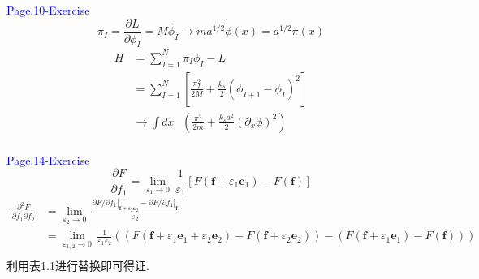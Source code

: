 \documentclass[12pt, a4paper, oneside]{ctexart}
\begin{document}
\textcolor{blue}{Page.10-Exercise}
\[{{\pi }_{I}}=\frac{\partial L}{\partial {{\phi }_{I}}}=M{{{\dot{\phi }}}_{I}}\to m{{a}^{1/2}}\dot{\phi }\left( x \right)={{a}^{1/2}}\pi \left( x \right)\]
\[\begin{aligned}
        H & =\sum\limits_{I=1}^{N}{{{\pi }_{I}}{{\phi }_{I}}}-L                                                                                    \\
          & =\sum\limits_{I=1}^{N}{\left[ \frac{\pi _{I}^{2}}{2M}+\frac{{{k}_{s}}}{2}{{\left( {{\phi }_{I+1}}-{{\phi }_{I}} \right)}^{2}} \right]} \\
          & \to \int{dx\text{ }\left( \frac{{{\pi }^{2}}}{2m}+\frac{{{k}_{s}}{{a}^{2}}}{2}{{\left( {{\partial }_{x}}\phi  \right)}^{2}} \right)}   \\
    \end{aligned}\]

\textcolor{blue}{Page.14-Exercise}
\[\frac{\partial F}{\partial {{f}_{1}}}=\underset{{{\varepsilon }_{1}}\to 0}{\mathop{\lim }}\,\frac{1}{{{\varepsilon }_{1}}}\left[ F\left( \mathbf{f}+{{\varepsilon }_{1}}{{\mathbf{e}}_{1}} \right)-F\left( \mathbf{f} \right) \right]\]
\[\begin{aligned}
        \frac{{{\partial }^{2}}F}{\partial {{f}_{1}}\partial {{f}_{2}}} & =\underset{{{\varepsilon }_{2}}\to 0}{\mathop{\lim }}\,\frac{{{\left. \partial F/\partial {{f}_{1}} \right|}_{\mathbf{f}+{{\varepsilon }_{2}}{{\mathbf{e}}_{2}}}}-{{\left. \partial F/\partial {{f}_{1}} \right|}_{\mathbf{f}}}}{{{\varepsilon }_{2}}}                                                                                                                                                                          \\
                                                                        & =\underset{{{\varepsilon }_{1,2}}\to 0}{\mathop{\lim }}\,\frac{1}{{{\varepsilon }_{1}}{{\varepsilon }_{2}}}\left( \left( F\left( \mathbf{f}+{{\varepsilon }_{1}}{{\mathbf{e}}_{1}}+{{\varepsilon }_{2}}{{\mathbf{e}}_{2}} \right)-F\left( \mathbf{f}+{{\varepsilon }_{2}}{{\mathbf{e}}_{2}} \right) \right)-\left( F\left( \mathbf{f}+{{\varepsilon }_{1}}{{\mathbf{e}}_{1}} \right)-F\left( \mathbf{f} \right) \right) \right) \\
    \end{aligned}\]
利用表1.1进行替换即可得证.
\end{document}
